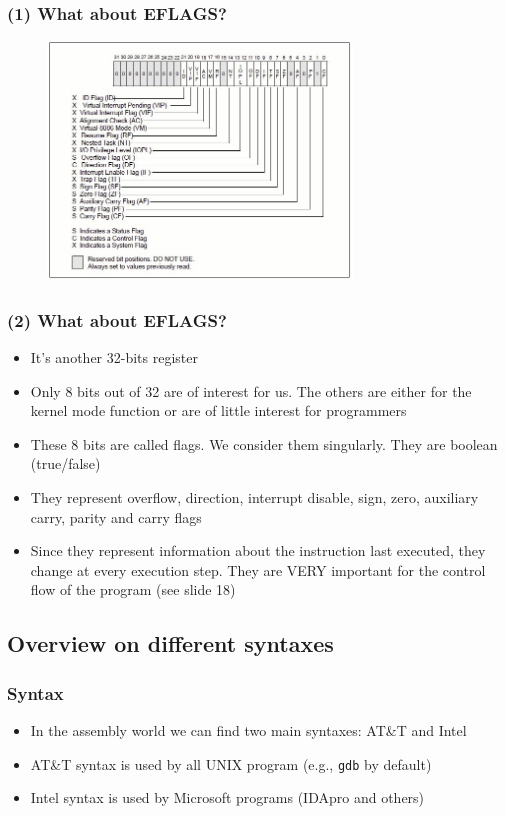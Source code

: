 \documentclass[]{beamer}
\begin{document}
\begin{frame}
  \frametitle{(1) What about EFLAGS?}
  \begin{figure}
    \includegraphics[height=2.5in]{images/eflags.jpeg}
    \label{Eflags idea}
  \end{figure}
\end{frame}
\begin{frame}
  \frametitle{(2) What about EFLAGS?}
  \begin{itemize}
  \item{It's another 32-bits register}
  \item{Only 8 bits out of 32 are of interest for us. The others are either for the kernel mode function or  are of little interest for programmers}
  \item{These 8 bits are called flags. We consider them singularly. They are boolean (true/false) }
  \item{They represent overflow, direction, interrupt disable, sign, zero, auxiliary carry, parity and carry flags}
  \item{Since they represent information about the instruction last executed, they change at every execution step. They are VERY important for the control flow of the program (see slide 18)}
  \end{itemize}
\end{frame}
\subsection{Overview on different syntaxes}
\begin{frame}
  \frametitle{Syntax}
  \begin{itemize}
  \item{In the assembly world we can find two main syntaxes: AT\&T and Intel}
  \item{AT\&T syntax is used by all UNIX program (e.g., \texttt{gdb} by default)}
  \item{Intel syntax is used by Microsoft programs (IDApro and others)}
  \end{itemize}
\end{frame}
\end{document}
